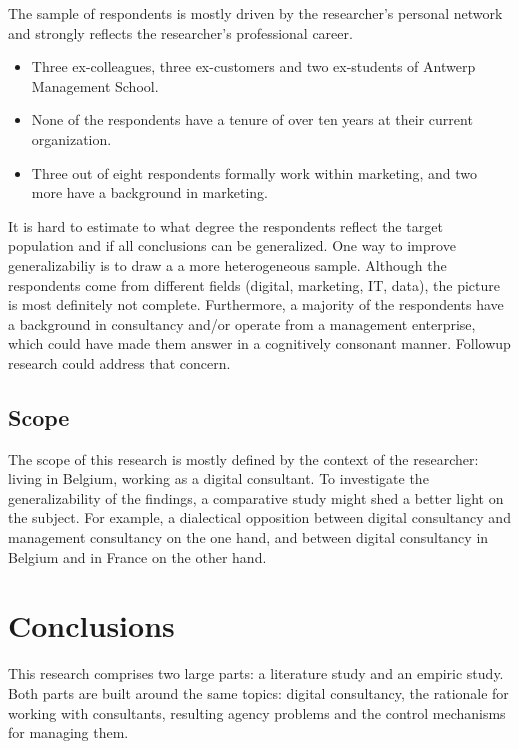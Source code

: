 \documentclass[
  man,floatsintext]{apa6}
\begin{document}
The sample of respondents is mostly driven by the researcher's personal network and strongly reflects the researcher's professional career.

\begin{itemize}
\item
  Three ex-colleagues, three ex-customers and two ex-students of Antwerp Management School.
\item
  None of the respondents have a tenure of over ten years at their current organization.
\item
  Three out of eight respondents formally work within marketing, and two more have a background in marketing.
\end{itemize}

It is hard to estimate to what degree the respondents reflect the target population and if all conclusions can be generalized. One way to improve generalizabiliy is to draw a a more heterogeneous sample. Although the respondents come from different fields (digital, marketing, IT, data), the picture is most definitely not complete. Furthermore, a majority of the respondents have a background in consultancy and/or operate from a management enterprise, which could have made them answer in a cognitively consonant manner. Followup research could address that concern.

\subsection{Scope}\label{scope-1}

The scope of this research is mostly defined by the context of the researcher: living in Belgium, working as a digital consultant. To investigate the generalizability of the findings, a comparative study might shed a better light on the subject. For example, a dialectical opposition between digital consultancy and management consultancy on the one hand, and between digital consultancy in Belgium and in France on the other hand.

\section{Conclusions}\label{conclusions}

This research comprises two large parts: a literature study and an empiric study. Both parts are built around the same topics: digital consultancy, the rationale for working with consultants, resulting agency problems and the control mechanisms for managing them.
\end{document}
